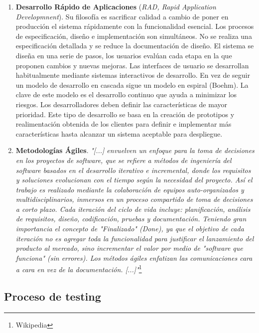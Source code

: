 \begin{enumerate}
\item \textbf{Desarrollo Rápido de Aplicaciones} (\emph{RAD, Rapid 
Application Developmnent}). Su filosofía es sacrificar calidad a 
cambio de poner en producción el sistema rápidamente con la funcionalidad 
esencial. Los procesos de especificación, diseño e implementación son 
simultáneos. No se realiza una especificación detallada y se reduce la 
documentación de diseño. El sistema se diseña en una serie de pasos, los 
usuarios evalúan cada etapa en la que proponen cambios y nuevas mejoras. Las 
interfaces de usuario se desarrollan habitualmente mediante sistemas 
interactivos de desarrollo. En vez de seguir un modelo de desarrollo en 
cascada sigue un modelo en espiral (Boehm). La clave de 
este modelo es el desarrollo continuo que ayuda a minimizar los riesgos. Los 
desarrolladores deben definir las características de mayor prioridad. Este 
tipo de desarrollo se basa en la creación de prototipos y realimentación 
obtenida de los clientes para definir e implementar más características hasta 
alcanzar un sistema aceptable para despliegue.

\item \textbf{Metodologías Ágiles}. \emph{"[...] envuelven un enfoque para la 
toma de decisiones en los proyectos de software, que se refiere a métodos de 
ingeniería del software basados en el desarrollo iterativo e incremental, 
donde los requisitos y soluciones evolucionan con el tiempo según la 
necesidad del proyecto. Así el trabajo es realizado mediante la colaboración 
de equipos auto-organizados y multidisciplinarios, inmersos en un proceso 
compartido de toma de decisiones a corto plazo. Cada iteración del ciclo de 
vida incluye:  planificación, análisis de requisitos, diseño, codificación, 
pruebas y  documentación. Teniendo gran importancia el concepto de 
"Finalizado" (Done), ya que el objetivo de cada iteración no es agregar toda 
la funcionalidad para justificar el lanzamiento del producto al mercado, sino 
incrementar el valor por medio de "software que funciona" (sin errores). Los 
métodos ágiles enfatizan las comunicaciones cara a cara en vez de la 
documentación. [...]"}\footnote{Wikipedia}
\end{enumerate}

\subsection{Proceso de testing}

